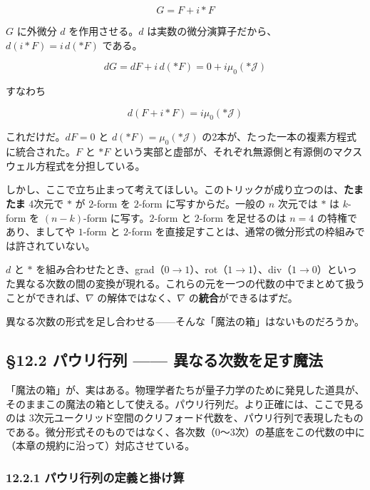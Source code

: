 \documentclass[a4paper,12pt,openany]{book}
\begin{document}
\[G = F + i\ast F\]

\(G\) に外微分 \(d\) を作用させる。\(d\)
は実数の微分演算子だから、\(d(i\ast F) = i\,d(\ast F)\) である。

\[dG = dF + i\,d(\ast F) = 0 + i\mu_0(\ast\mathcal{J})\]

すなわち

\[d(F + i\ast F) = i\mu_0(\ast\mathcal{J})\]

これだけだ。\(dF=0\) と \(d(\ast F)=\mu_0(\ast\mathcal{J})\)
の2本が、たった一本の複素方程式に統合された。\(F\) と \(\ast F\)
という実部と虚部が、それぞれ無源側と有源側のマクスウェル方程式を分担している。

しかし、ここで立ち止まって考えてほしい。このトリックが成り立つのは、\textbf{たまたま}
4次元で \(\ast\) が \(2\)-form を \(2\)-form に写すからだ。一般の \(n\)
次元では \(\ast\) は \(k\)-form を \((n-k)\)-form に写す。\(2\)-form と
\(2\)-form を足せるのは \(n=4\) の特権であり、ましてや \(1\)-form と
\(2\)-form を直接足すことは、通常の微分形式の枠組みでは許されていない。

\(d\) と \(\ast\)
を組み合わせたとき、grad（\(0\to1\)）、rot（\(1\to1\)）、div（\(1\to0\)）といった異なる次数の間の変換が現れる。これらの元を一つの代数の中でまとめて扱うことができれば、\(\nabla\)
の解体ではなく、\(\nabla\) の\textbf{統合}ができるはずだ。

異なる次数の形式を足し合わせる——そんな「魔法の箱」はないものだろうか。

\par\vspace{0.35em}\par

\hypertarget{ux30d1ux30a6ux30eaux884cux5217-ux7570ux306aux308bux6b21ux6570ux3092ux8db3ux3059ux9b54ux6cd5}{%
\subsection{§12.2 パウリ行列 ——
異なる次数を足す魔法}\label{ux30d1ux30a6ux30eaux884cux5217-ux7570ux306aux308bux6b21ux6570ux3092ux8db3ux3059ux9b54ux6cd5}}

「魔法の箱」が、実はある。物理学者たちが量子力学のために発見した道具が、そのままこの魔法の箱として使える。パウリ行列だ。より正確には、ここで見るのは
3次元ユークリッド空間のクリフォード代数を、パウリ行列で表現したものである。微分形式そのものではなく、各次数（0〜3次）の基底をこの代数の中に（本章の規約に沿って）対応させている。

\hypertarget{ux30d1ux30a6ux30eaux884cux5217ux306eux5b9aux7fa9ux3068ux639bux3051ux7b97}{%
\subsubsection{12.2.1
パウリ行列の定義と掛け算}\label{ux30d1ux30a6ux30eaux884cux5217ux306eux5b9aux7fa9ux3068ux639bux3051ux7b97}}
\end{document}
